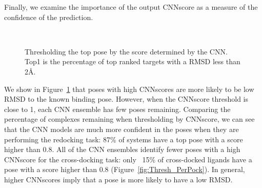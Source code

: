 \documentclass[linenumbers,doublespacing]{bmcart}
\begin{document}
Finally, we examine the importance of the output CNNscore as a measure of the confidence of the prediction. 
\begin{figure}[tb]
            \\
	\caption{Thresholding the top pose by the score determined by the CNN. Top1 is the percentage of top ranked targets with a RMSD less than 2{\AA}.}
	\label{fig:ScoreThresh}
\end{figure} 

We show in Figure~\ref{fig:ScoreThresh} that poses with high CNNscores are more likely to be low RMSD to the known binding pose. However, when the CNNscore threshold is close to 1, each CNN ensemble has few poses remaining. Comparing the percentage of complexes remaining when thresholding by CNNscore, we can see that the CNN models are much more confident in the poses when they are performing the redocking task: 87\% of systems have a top pose with a score higher than 0.8. All of the CNN ensembles identify fewer poses with a high CNNscore for the cross-docking task: only ~15\% of cross-docked ligands have a pose with a score higher than 0.8 (Figure~\ref{fig:Thresh_PerPock}). In general, higher CNNscores imply that a pose is more likely to have a low RMSD. 
\end{document}
